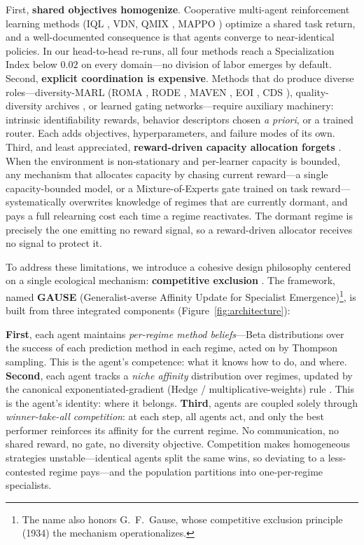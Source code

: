 \documentclass[10pt]{article}
\begin{document}
First, \textbf{shared objectives homogenize}. Cooperative multi-agent
reinforcement learning methods (IQL \cite{tan1993multi}, VDN, QMIX
\cite{rashid2018qmix}, MAPPO \cite{yu2022surprising}) optimize a shared task
return, and a well-documented consequence is that agents converge to
near-identical policies. In our head-to-head re-runs, all four methods reach a
Specialization Index below $0.02$ on every domain---no division of labor emerges
by default. Second, \textbf{explicit coordination is expensive}. Methods that do
produce diverse roles---diversity-MARL (ROMA \cite{wang2020roma}, RODE
\cite{wang2021rode}, MAVEN \cite{mahajan2019maven}, EOI \cite{jiang2021eoi},
CDS \cite{li2021cds}), quality-diversity archives
\cite{mouret2015illuminating, pugh2016quality}, or learned gating
networks---require auxiliary machinery: intrinsic identifiability rewards,
behavior descriptors chosen \emph{a priori}, or a trained router. Each adds
objectives, hyperparameters, and failure modes of its own. Third, and least
appreciated, \textbf{reward-driven capacity allocation forgets}
\cite{french1999catastrophic, kirkpatrick2017overcoming}. When the environment
is non-stationary and per-learner capacity is bounded, any mechanism that
allocates capacity by chasing current reward---a single capacity-bounded model,
or a Mixture-of-Experts gate trained on task reward---systematically overwrites
knowledge of regimes that are currently dormant, and pays a full relearning
cost each time a regime reactivates. The dormant regime is precisely the one
emitting no reward signal, so a reward-driven allocator receives no signal to
protect it.

To address these limitations, we introduce a cohesive design philosophy centered
on a single ecological mechanism: \textbf{competitive exclusion}
\cite{gause1934struggle, hardin1960competitive, macarthur1958population}. The
framework, named \textbf{GAUSE} (Generalist-averse Affinity Update for
Specialist Emergence)\footnote{The name also honors G.~F.~Gause, whose
competitive exclusion principle (1934) the mechanism operationalizes.}, is built from three integrated
components (Figure~\ref{fig:architecture}):

\textbf{First}, each agent maintains \emph{per-regime method beliefs}---Beta
distributions over the success of each prediction method in each regime, acted
on by Thompson sampling. This is the agent's competence: what it knows how to do,
and where. \textbf{Second}, each agent tracks a \emph{niche affinity}
distribution over regimes, updated by the canonical exponentiated-gradient
(Hedge / multiplicative-weights) rule
\cite{kivinen1997exponentiated, freund1997decision, arora2012multiplicative}.
This is the agent's identity: where it
belongs. \textbf{Third}, agents are coupled solely through \emph{winner-take-all
competition}: at each step, all agents act, and only the best performer
reinforces its affinity for the current regime. No communication, no shared
reward, no gate, no diversity objective. Competition makes homogeneous strategies
unstable---identical agents split the same wins, so deviating to a less-contested
regime pays---and the population partitions into one-per-regime specialists.
\end{document}
